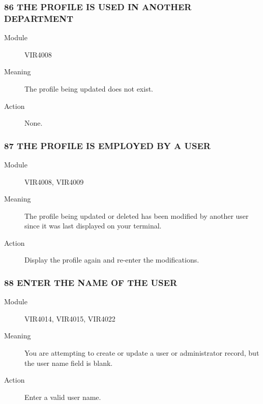 \documentclass[letterpaper,10pt,english]{sphinxmanual}
\begin{document}
\subsubsection{86 THE PROFILE IS USED IN ANOTHER DEPARTMENT}
\label{\detokenize{messages:the-profile-is-used-in-another-department}}\begin{description}
\item[{Module}] \leavevmode
VIR4008

\item[{Meaning}] \leavevmode
The profile being updated does not exist.

\item[{Action}] \leavevmode
None.

\end{description}


\subsubsection{87 THE PROFILE IS EMPLOYED BY A USER}
\label{\detokenize{messages:the-profile-is-employed-by-a-user}}\begin{description}
\item[{Module}] \leavevmode
VIR4008, VIR4009

\item[{Meaning}] \leavevmode
The profile being updated or deleted has been modified by another user since it was last displayed on your terminal.

\item[{Action}] \leavevmode
Display the profile again and re-enter the modifications.

\end{description}


\subsubsection{88 ENTER THE NAME OF THE USER}
\label{\detokenize{messages:enter-the-name-of-the-user}}\begin{description}
\item[{Module}] \leavevmode
VIR4014, VIR4015, VIR4022

\item[{Meaning}] \leavevmode
You are attempting to create or update a user or administrator record, but the user name field is blank.

\item[{Action}] \leavevmode
Enter a valid user name.

\end{description}
\end{document}
